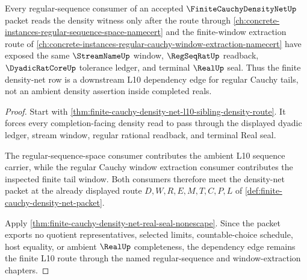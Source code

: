 \begin{theorem}
\label{thm:finite-cauchy-density-net-l10-regular-sequence-consumer-route}
Every regular-sequence consumer of an accepted $\FiniteCauchyDensityNetUp$ packet reads the density witness only after the route through \autoref{ch:concrete-instances-regular-sequence-space-namecert} and the finite-window extraction route of \autoref{ch:concrete-instances-regular-cauchy-window-extraction-namecert} have exposed the same $\StreamNameUp$ window, $\RegSeqRatUp$ readback, $\DyadicRatCoreUp$ tolerance ledger, and terminal $\RealUp$ seal. Thus the finite density-net row is a downstream L10 dependency edge for regular Cauchy tails, not an ambient density assertion inside completed reals.
\end{theorem}
\begin{proof}
Start with \autoref{thm:finite-cauchy-density-net-l10-sibling-density-route}. It forces every completion-facing density read to pass through the displayed dyadic ledger, stream window, regular rational readback, and terminal Real seal.

The regular-sequence-space consumer contributes the ambient L10 sequence carrier, while the regular Cauchy window extraction consumer contributes the inspected finite tail window. Both consumers therefore meet the density-net packet at the already displayed route $D,W,R,E,M,T,C,P,L$ of \autoref{def:finite-cauchy-density-net-packet}.

Apply \autoref{thm:finite-cauchy-density-net-real-seal-nonescape}. Since the packet exports no quotient representatives, selected limits, countable-choice schedule, host equality, or ambient $\RealUp$ completeness, the dependency edge remains the finite L10 route through the named regular-sequence and window-extraction chapters.
\end{proof}
